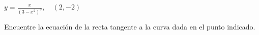 \item $\displaystyle y = \frac{x}{(3 - x^2)^5}, \quad (2, -2)$
\par
Encuentre la ecuación de la recta tangente a la curva dada en el punto indicado.
